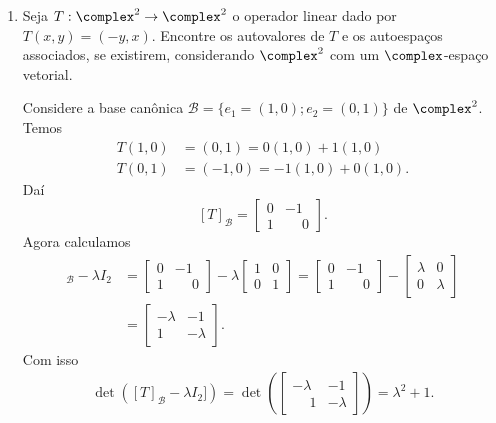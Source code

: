 \begin{exemplo}
\begin{enumerate}[label={\arabic*})]
        \item Seja $T : \complex^2 \to \complex^2$ o operador linear dado por $T(x,y) = (-y,x)$. Encontre os autovalores de $T$ e os autoespaços associados, se existirem, considerando $\complex^2$ com um $\complex$-espaço vetorial.
        \begin{solucao}
            Considere a base canônica $\mathcal{B} = \{e_1 = (1, 0); e_2 = (0, 1)\}$ de $\complex^2$. Temos
            \begin{align}
                T(1,0) &= (0,1) = 0(1,0) + 1(1,0)\\
                T(0,1) &= (-1,0) = -1(1,0) + 0(1,0).
            \end{align}
            Daí
            \[
                [T]_\mathcal{B} = \begin{bmatrix}0 & -1\\ 1 & \phantom{-}0\end{bmatrix}.
            \]
            Agora calculamos
            \begin{align*}
                [T]_\mathcal{B} - \lambda I_2 &= \begin{bmatrix}0 & -1\\ 1 & \phantom{-}0\end{bmatrix} - \lambda\begin{bmatrix}1 & 0\\0 & 1\end{bmatrix} = \begin{bmatrix}0 & -1\\ 1 & \phantom{-}0\end{bmatrix} - \begin{bmatrix}\lambda & 0\\0 & \lambda\end{bmatrix}\\ &= \begin{bmatrix}-\lambda & -1\\ 1 & -\lambda\end{bmatrix}.
            \end{align*}
            Com isso
            \begin{align*}
                \det([T]_\mathcal{B} - \lambda I_2]) = \det\left(\begin{bmatrix} -\lambda & -1\\\phantom{-}1 & -\lambda\end{bmatrix}\right) = \lambda^2 + 1.
            \end{align*}


\end{solucao}
\end{enumerate}
\end{exemplo}
